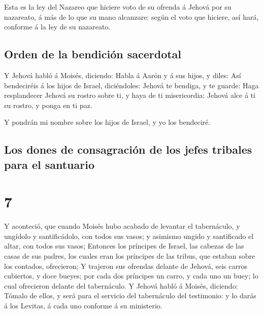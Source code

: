  Esta es la ley del Nazareo que hiciere voto de su ofrenda
á Jehová por su nazareato, á más de lo que su mano alcanzare: según el
voto que hiciere, así hará, conforme á la ley de su nazareato.

\hypertarget{orden-de-la-bendiciuxf3n-sacerdotal}{%
\subsection{Orden de la bendición
sacerdotal}\label{orden-de-la-bendiciuxf3n-sacerdotal}}

 Y Jehová habló á Moisés, diciendo:  Habla á
Aarón y á sus hijos, y diles: Así bendeciréis á los hijos de Israel,
diciéndoles:  Jehová te bendiga, y te guarde: 
Haga resplandecer Jehová su rostro sobre ti, y haya de ti misericordia:
 Jehová alce á ti su rostro, y ponga en ti paz.

 Y pondrán mi nombre sobre los hijos de Israel, y yo los
bendeciré.

\hypertarget{los-dones-de-consagraciuxf3n-de-los-jefes-tribales-para-el-santuario}{%
\subsection{Los dones de consagración de los jefes tribales para el
santuario}\label{los-dones-de-consagraciuxf3n-de-los-jefes-tribales-para-el-santuario}}

\hypertarget{section-6}{%
\section{7}\label{section-6}}

 Y aconteció, que cuando Moisés hubo acabado de levantar el
tabernáculo, y ungídolo y santificádolo, con todos sus vasos; y asimismo
ungido y santificado el altar, con todos sus vasos; 
Entonces los príncipes de Israel, las cabezas de las casas de sus
padres, los cuales eran los príncipes de las tribus, que estaban sobre
los contados, ofrecieron;  Y trajeron sus ofrendas delante
de Jehová, seis carros cubiertos, y doce bueyes; por cada dos príncipes
un carro, y cada uno un buey; lo cual ofrecieron delante del
tabernáculo.  Y Jehová habló á Moisés, diciendo:
 Tómalo de ellos, y será para el servicio del tabernáculo
del testimonio: y lo darás á los Levitas, á cada uno conforme á su
ministerio.

